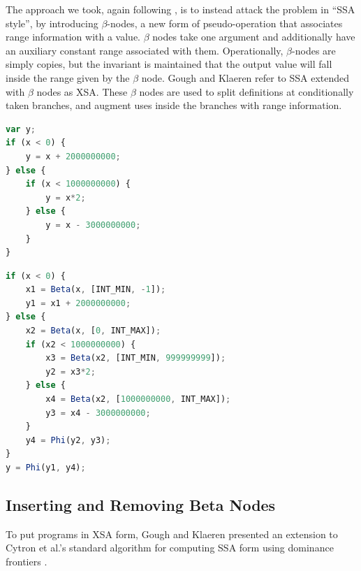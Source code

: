 \documentclass{article}
\begin{document}
The approach we took, again following \cite{Gough94eliminatingrange},
is to instead attack the problem in ``SSA style'', by introducing
$\beta$-nodes, a new form of pseudo-operation that associates range
information with a value. $\beta$ nodes take one argument and
additionally have an auxiliary constant range associated with
them. Operationally, $\beta$-nodes are simply copies, but the
invariant is maintained that the output value will fall inside the
range given by the $\beta$ node. Gough and Klaeren refer to SSA
extended with $\beta$ nodes as XSA. These $\beta$ nodes are used to split
definitions at conditionally taken branches, and augment uses inside the
branches with range information.

\begin{lstlisting}[language=Javascript,
                   caption={Code that requires information about branches to properly analyze},
                   label={fig:branch}, float=ht]
var y;
if (x < 0) {
    y = x + 2000000000;
} else {
    if (x < 1000000000) {
        y = x*2;
    } else {
        y = x - 3000000000;
    }
}
\end{lstlisting}

\begin{lstlisting}[language=Javascript,
                   caption={Code from Figure \ref{fig:branch}, in XSA form},
                   label={fig:xsa}, float=ht]
if (x < 0) {
    x1 = Beta(x, [INT_MIN, -1]);
    y1 = x1 + 2000000000;
} else {
    x2 = Beta(x, [0, INT_MAX]);
    if (x2 < 1000000000) {
        x3 = Beta(x2, [INT_MIN, 999999999]);
        y2 = x3*2;
    } else {
        x4 = Beta(x2, [1000000000, INT_MAX]);
        y3 = x4 - 3000000000;
    }
    y4 = Phi(y2, y3);
}
y = Phi(y1, y4);
\end{lstlisting}

\subsection{Inserting and Removing Beta Nodes}
To put programs in XSA form, Gough and Klaeren presented an extension
to Cytron et al.'s standard algorithm for computing SSA form using
dominance frontiers \cite{Cytron}.
\end{document}
